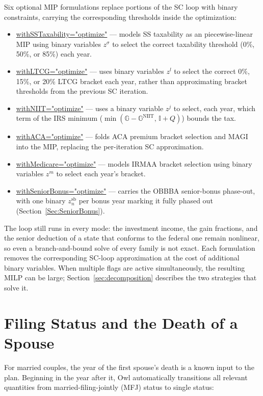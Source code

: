 \documentclass[fleqn,12pt]{report}
\newcommand{\code}[1]{\url{#1}}
\begin{document}
Six optional MIP formulations replace portions of the SC loop with binary
constraints, carrying the corresponding thresholds inside the optimization:
\begin{itemize}[nosep]
  \item \code{withSSTaxability="optimize"} --- models SS taxability as an
    piecewise-linear MIP using binary variables $z^\sigma$ to select
    the correct taxability threshold (0\%, 50\%, or 85\%) each year.
  \item \code{withLTCG="optimize"} --- uses binary variables $z^l$ to select
    the correct 0\%, 15\%, or 20\% LTCG bracket each year, rather than
    approximating bracket thresholds from the previous SC iteration.
  \item \code{withNIIT="optimize"} --- uses a binary variable $z^j$ to
    select, each year, which term of the IRS minimum
    ($\min(\mathbb{G}-\mathbb{G}^{\mathrm{NIIT}},\,\mathbb{I}+Q)$) bounds the tax.
  \item \code{withACA="optimize"} --- folds ACA premium bracket selection and
    MAGI into the MIP, replacing the per-iteration SC approximation.
  \item \code{withMedicare="optimize"} --- models IRMAA bracket selection
    using binary variables $z^m$ to select each year's bracket.
  \item \code{withSeniorBonus="optimize"} --- carries the OBBBA senior-bonus
    phase-out, with one binary $z^{\mathrm{sb}}_n$ per bonus year marking it
    fully phased out (Section~\ref{Sec:SeniorBonus}).
\end{itemize}
The loop still runs in every mode: the investment income, the gain fractions,
and the senior deduction of a state that conforms to the federal one remain
nonlinear, so even a branch-and-bound solve of every family is not exact.
Each formulation removes the corresponding SC-loop approximation at the cost of
additional binary variables.
When multiple flags are active simultaneously, the resulting MILP can be large;
Section~\ref{sec:decomposition} describes the two strategies that solve it.

\section{Filing Status and the Death of a Spouse}

For married couples, the year of the first spouse's death is a known input
to the plan.
Beginning in the year after it, Owl automatically transitions all relevant
quantities from married-filing-jointly (MFJ) status to single status:
\end{document}
